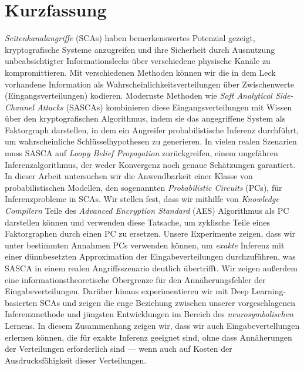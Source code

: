 \chapter{Kurzfassung}

\emph{Seitenkanalangriffe} (SCAs) haben bemerkenswertes Potenzial gezeigt, kryptografische Systeme anzugreifen und ihre Sicherheit durch Ausnutzung unbeabsichtigter Informationslecks über verschiedene physische Kanäle zu kompromittieren. Mit verschiedenen Methoden können wir die in dem Leck vorhandene Information als Wahrscheinlichkeitsverteilungen über Zwischenwerte (Eingangsverteilungen) kodieren. Modernste Methoden wie \emph{Soft Analytical Side-Channel Attacks} (SASCAs) kombinieren diese Eingangsverteilungen mit Wissen über den kryptografischen Algorithmus, indem sie das angegriffene System als Faktorgraph darstellen, in dem ein Angreifer probabilistische Inferenz durchführt, um wahrscheinliche Schlüsselhypothesen zu generieren. In vielen realen Szenarien muss SASCA auf \emph{Loopy Belief Propagation} zurückgreifen, einem ungefähren Inferenzalgorithmus, der weder Konvergenz noch genaue Schätzungen garantiert. In dieser Arbeit untersuchen wir die Anwendbarkeit einer Klasse von probabilistischen Modellen, den sogenannten \emph{Probabilistic Circuits} (PCs), für Inferenzprobleme in SCAs. Wir stellen fest, dass wir mithilfe von \emph{Knowledge Compilern} Teile des \emph{Advanced Encryption Standard} (AES) Algorithmus als PC darstellen können und verwenden diese Tatsache, um zyklische Teile eines Faktorgraphen durch einen PC zu ersetzen. Unsere Experimente zeigen, dass wir unter bestimmten Annahmen PCs verwenden können, um \emph{exakte} Inferenz mit einer dünnbesetzten Approximation der Eingabeverteilungen durchzuführen, was SASCA in einem realen Angriffsszenario deutlich übertrifft. Wir zeigen au{\ss}erdem eine informationstheoretische Obergrenze für den Annäherungsfehler der Eingabeverteilungen. Darüber hinaus experimentieren wir mit Deep Learning-basierten SCAs und zeigen die enge Beziehung zwischen unserer vorgeschlagenen Inferenzmethode und jüngsten Entwicklungen im Bereich des \emph{neurosymbolischen} Lernens.
In diesem Zusammenhang zeigen wir, dass wir auch Eingabevertellungen erlernen können, die für exakte Inferenz geeignet sind, ohne dass  Annäherungen der Verteilungen erforderlich sind --- wenn auch auf Kosten der Ausdrucksfähigkeit dieser Verteilungen.